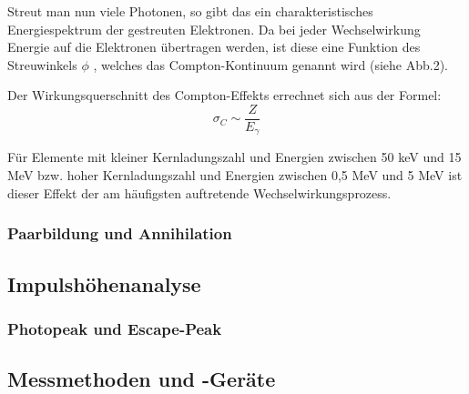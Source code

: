 Streut man nun viele Photonen, so gibt das ein charakteristisches Energiespektrum der gestreuten Elektronen. Da bei jeder Wechselwirkung Energie auf die Elektronen übertragen werden, ist diese eine Funktion des Streuwinkels $\phi$ , welches das Compton-Kontinuum genannt wird (siehe Abb.2).


Der Wirkungsquerschnitt des Compton-Effekts errechnet sich aus der Formel:
	\begin{equation}
	\sigma_{C} \sim \frac{Z}{E_{\gamma}}
	\end{equation}
	
Für Elemente mit kleiner Kernladungszahl und Energien zwischen 50 keV und 15 MeV bzw. hoher Kernladungszahl und Energien zwischen 0,5 MeV und 5 MeV ist dieser Effekt der am häufigsten auftretende Wechselwirkungsprozess.

\subsubsection*{Paarbildung und Annihilation}
\subsection{Impulshöhenanalyse}
\subsubsection*{Photopeak und Escape-Peak}
\subsection{Messmethoden und -Geräte}